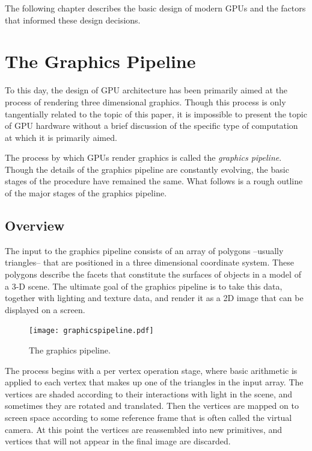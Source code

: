 \documentclass[12pt,twoside]{reedthesis}
\newcommand{\im}[1]{{\em#1}}
\begin{document}
The following chapter describes the basic design of modern GPUs and the factors that informed these design decisions.

\section{The Graphics Pipeline}

To this day, the design of GPU architecture has been primarily aimed at the process of rendering three dimensional graphics. Though this process is only tangentially related to the topic of this paper, it is impossible to present the topic of GPU hardware without a brief discussion of the specific type of computation at which it is primarily aimed.

The process by which GPUs render graphics is called the \im{graphics pipeline}. Though the details of the graphics pipeline are constantly evolving, the basic stages of the procedure have remained the same. What follows is a rough outline of the major stages of the graphics pipeline.

\subsection{Overview}

The input to the graphics pipeline consists of an array of polygons --usually triangles-- that are positioned in a three dimensional coordinate system. These polygons describe the facets that constitute the surfaces of objects in a model of a 3-D scene. The ultimate goal of the graphics pipeline is to take this data, together with lighting and texture data, and render it as a 2D image that can be displayed on a screen.

\begin{figure}[h]
\begin{center}
\texttt{[image: graphicspipeline.pdf]}
\end{center}
\caption{The graphics pipeline.}
\end{figure}
\vspace{1pc}

The process begins with a per vertex operation stage, where basic arithmetic is applied to each vertex that makes up one of the triangles in the input array. The vertices are shaded according to their interactions with light in the scene, and sometimes they are rotated and translated. Then the vertices are mapped on to screen space according to some reference frame that is often called the virtual camera.  At this point the vertices are reassembled into new primitives, and vertices that will not appear in the final image are discarded.
\end{document}

